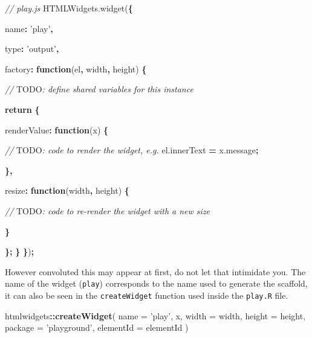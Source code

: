 \documentclass[10pt,]{krantz}
\makeatletter
\newenvironment{Shaded}{\begin{snugshade}}{\end{snugshade}}
\newcommand{\AlertTok}[1]{\textcolor[rgb]{0.33,0.33,0.33}{#1}}
\newcommand{\AttributeTok}[1]{\textcolor[rgb]{0.61,0.61,0.61}{#1}}
\newcommand{\CommentTok}[1]{\textcolor[rgb]{0.37,0.37,0.37}{\textit{#1}}}
\newcommand{\ControlFlowTok}[1]{\textcolor[rgb]{0.27,0.27,0.27}{\textbf{#1}}}
\newcommand{\DataTypeTok}[1]{\textcolor[rgb]{0.27,0.27,0.27}{#1}}
\newcommand{\KeywordTok}[1]{\textcolor[rgb]{0.27,0.27,0.27}{\textbf{#1}}}
\newcommand{\NormalTok}[1]{#1}
\newcommand{\OperatorTok}[1]{\textcolor[rgb]{0.43,0.43,0.43}{\textbf{#1}}}
\newcommand{\StringTok}[1]{\textcolor[rgb]{0.5,0.5,0.5}{#1}}
\newcommand{\VariableTok}[1]{\textcolor[rgb]{0,0,0}{#1}}
\newenvironment{kframe}{%
\medskip{}
\setlength{\fboxsep}{.8em}
 \def\at@end@of@kframe{}%
 \ifinner\ifhmode%
  \def\at@end@of@kframe{\end{minipage}}%
  \begin{minipage}{\columnwidth}%
 \fi\fi%
 \def\FrameCommand##1{\hskip\@totalleftmargin \hskip-\fboxsep
 \colorbox{shadecolor}{##1}\hskip-\fboxsep
     \hskip-\linewidth \hskip-\@totalleftmargin \hskip\columnwidth}%
 \MakeFramed {\advance\hsize-\width
   \@totalleftmargin\z@ \linewidth\hsize
   \@setminipage}}%
 {\par\unskip\endMakeFramed%
 \at@end@of@kframe}
\renewenvironment{Shaded}{\begin{kframe}}{\end{kframe}}
\makeatother
\begin{document}
\begin{Shaded}
\begin{Highlighting}[]
\CommentTok{// play.js}
\VariableTok{HTMLWidgets}\NormalTok{.}\AttributeTok{widget}\NormalTok{(}\OperatorTok{\{}

  \DataTypeTok{name}\OperatorTok{:} \StringTok{'play'}\OperatorTok{,}

  \DataTypeTok{type}\OperatorTok{:} \StringTok{'output'}\OperatorTok{,}

  \DataTypeTok{factory}\OperatorTok{:} \KeywordTok{function}\NormalTok{(el}\OperatorTok{,}\NormalTok{ width}\OperatorTok{,}\NormalTok{ height) }\OperatorTok{\{}

    \CommentTok{// }\AlertTok{TODO}\CommentTok{: define shared variables for this instance}

    \ControlFlowTok{return} \OperatorTok{\{}

      \DataTypeTok{renderValue}\OperatorTok{:} \KeywordTok{function}\NormalTok{(x) }\OperatorTok{\{}

        \CommentTok{// }\AlertTok{TODO}\CommentTok{: code to render the widget, e.g.}
        \VariableTok{el}\NormalTok{.}\AttributeTok{innerText} \OperatorTok{=} \VariableTok{x}\NormalTok{.}\AttributeTok{message}\OperatorTok{;}

      \OperatorTok{\},}

      \DataTypeTok{resize}\OperatorTok{:} \KeywordTok{function}\NormalTok{(width}\OperatorTok{,}\NormalTok{ height) }\OperatorTok{\{}

        \CommentTok{// }\AlertTok{TODO}\CommentTok{: code to re-render the widget with a new size}

      \OperatorTok{\}}

    \OperatorTok{\};}
  \OperatorTok{\}}
\OperatorTok{\}}\NormalTok{)}\OperatorTok{;}
\end{Highlighting}
\end{Shaded}

However convoluted this may appear at first, do not let that intimidate you. The name of the widget (\texttt{play}) corresponds to the name used to generate the scaffold, it can also be seen in the \texttt{createWidget} function used inside the \texttt{play.R} file.

\begin{Shaded}
\begin{Highlighting}[]
\NormalTok{htmlwidgets}\OperatorTok{::}\KeywordTok{createWidget}\NormalTok{(}
  \DataTypeTok{name =} \StringTok{'play'}\NormalTok{,}
\NormalTok{  x,}
  \DataTypeTok{width =}\NormalTok{ width,}
  \DataTypeTok{height =}\NormalTok{ height,}
  \DataTypeTok{package =} \StringTok{'playground'}\NormalTok{,}
  \DataTypeTok{elementId =}\NormalTok{ elementId}
\NormalTok{)}
\end{Highlighting}
\end{Shaded}
\end{document}
